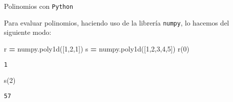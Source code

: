 \documentclass[
  ignorenonframetext,
]{beamer}
\newenvironment{Shaded}{\begin{snugshade}}{\end{snugshade}}
\newcommand{\DecValTok}[1]{\textcolor[rgb]{0.00,0.00,0.81}{#1}}
\newcommand{\NormalTok}[1]{#1}
\newcommand{\OperatorTok}[1]{\textcolor[rgb]{0.81,0.36,0.00}{\textbf{#1}}}
\begin{document}
\begin{frame}[fragile]{Polinomios con \texttt{Python}}
\protect\hypertarget{polinomios-con-python-10}{}

Para evaluar polinomios, haciendo uso de la librería \texttt{numpy}, lo
hacemos del siguiente modo:

\begin{Shaded}
\begin{Highlighting}[]
\NormalTok{r }\OperatorTok{=}\NormalTok{ numpy.poly1d([}\DecValTok{1}\NormalTok{,}\DecValTok{2}\NormalTok{,}\DecValTok{1}\NormalTok{]) }
\NormalTok{s }\OperatorTok{=}\NormalTok{ numpy.poly1d([}\DecValTok{1}\NormalTok{,}\DecValTok{2}\NormalTok{,}\DecValTok{3}\NormalTok{,}\DecValTok{4}\NormalTok{,}\DecValTok{5}\NormalTok{])}
\NormalTok{r(}\DecValTok{0}\NormalTok{)}
\end{Highlighting}
\end{Shaded}

\begin{verbatim}
1
\end{verbatim}

\begin{Shaded}
\begin{Highlighting}[]
\NormalTok{s(}\DecValTok{2}\NormalTok{)}
\end{Highlighting}
\end{Shaded}

\begin{verbatim}
57
\end{verbatim}

\end{frame}
\end{document}
